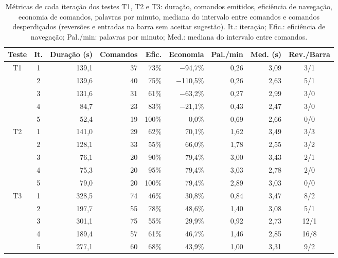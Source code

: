 \begin{table}[htbp]
    \centering
    \caption{Métricas de cada iteração dos testes T1, T2 e T3: duração, comandos emitidos, eficiência de navegação, economia de comandos, palavras por minuto, mediana do intervalo entre comandos e comandos desperdiçados (reversões e entradas na barra sem aceitar sugestão). It.: iteração; Efic.: eficiência de navegação; Pal./min: palavras por minuto; Med.: mediana do intervalo entre comandos.}
    \label{tab:iteracoes}
    \small
    \begin{tabular}{ccrrrrrrc}
        \hline
        Teste & It. & Duração (s) & Comandos & Efic. & Economia & Pal./min & Med. (s) & Rev./Barra \\
        \hline
        T1 & 1 & 139,1 & 37 & 73\% & $-$94,7\% & 0,26 & 3,09 & 3/1 \\
           & 2 & 139,6 & 40 & 75\% & $-$110,5\% & 0,26 & 2,63 & 5/1 \\
           & 3 & 131,6 & 31 & 61\% & $-$63,2\% & 0,27 & 2,99 & 3/0 \\
           & 4 & 84,7 & 23 & 83\% & $-$21,1\% & 0,43 & 2,47 & 3/0 \\
           & 5 & 52,4 & 19 & 100\% & 0,0\% & 0,69 & 2,66 & 0/0 \\
        \hline
        T2 & 1 & 141,0 & 29 & 62\% & 70,1\% & 1,62 & 3,49 & 3/3 \\
           & 2 & 128,1 & 33 & 55\% & 66,0\% & 1,78 & 2,55 & 3/2 \\
           & 3 & 76,1 & 20 & 90\% & 79,4\% & 3,00 & 3,43 & 2/1 \\
           & 4 & 75,3 & 20 & 95\% & 79,4\% & 3,03 & 2,78 & 2/0 \\
           & 5 & 79,0 & 20 & 100\% & 79,4\% & 2,89 & 3,03 & 0/0 \\
        \hline
        T3 & 1 & 328,5 & 74 & 46\% & 30,8\% & 0,84 & 3,47 & 8/2 \\
           & 2 & 197,7 & 55 & 78\% & 48,6\% & 1,40 & 3,08 & 5/1 \\
           & 3 & 301,1 & 75 & 55\% & 29,9\% & 0,92 & 2,73 & 12/1 \\
           & 4 & 189,4 & 57 & 61\% & 46,7\% & 1,46 & 2,85 & 16/8 \\
           & 5 & 277,1 & 60 & 68\% & 43,9\% & 1,00 & 3,31 & 9/2 \\
        \hline
    \end{tabular}
\end{table}

